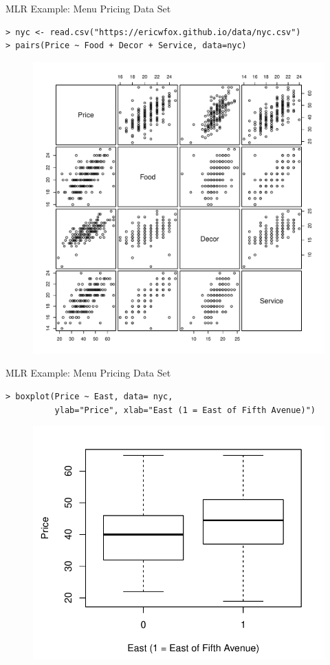\documentclass[10pt]{beamer}
\begin{document}
\begin{frame}[fragile]{MLR Example: Menu Pricing Data Set}
\small
\begin{verbatim}
> nyc <- read.csv("https://ericwfox.github.io/data/nyc.csv")
> pairs(Price ~ Food + Decor + Service, data=nyc)
\end{verbatim}
\begin{figure}
\includegraphics[scale=0.4]{figure/menu_pairs.pdf}
\end{figure}
\end{frame}

\begin{frame}[fragile]{MLR Example: Menu Pricing Data Set}
\small
\begin{verbatim}
> boxplot(Price ~ East, data= nyc, 
          ylab="Price", xlab="East (1 = East of Fifth Avenue)")
\end{verbatim}
\begin{figure}
\includegraphics[scale=0.5]{figure/east_boxplot.pdf}
\end{figure}
\end{frame}
\end{document}
